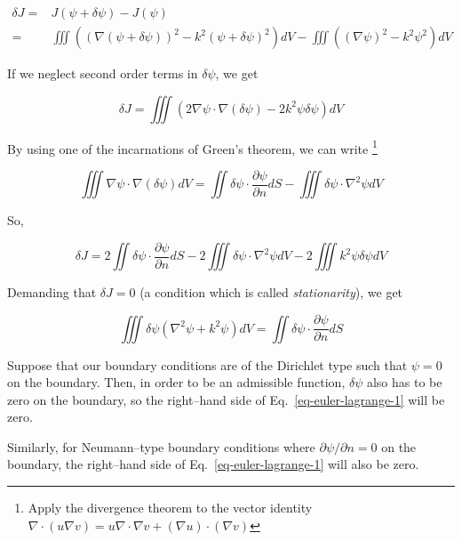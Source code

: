 \begin{align}
\delta J =& J(\psi + \delta \psi) - J(\psi) \\
         =& \iiint \left( (\nabla (\psi + \delta \psi))^2 - k^2 (\psi + \delta \psi)^2 \right) dV - \iiint \left((\nabla \psi)^2 - k^2 \psi^2 \right) dV
\end{align} 

If we neglect second order terms in $\delta \psi$, we get

\begin{equation}
\delta J = \iiint \left( 2 \nabla \psi \cdot \nabla (\delta \psi) - 2 k^2 \psi \delta \psi \right) dV
\end{equation}

By using one of the incarnations of Green's theorem, we can write \footnote{Apply the divergence theorem to the vector identity $\nabla \cdot (u \nabla v) = u \nabla \cdot \nabla v + (\nabla u) \cdot (\nabla v)$}

\begin{equation}
\iiint \nabla \psi \cdot \nabla (\delta \psi) dV = \iint \delta \psi \cdot \frac{\partial \psi}{\partial n} dS - \iiint \delta \psi \cdot \nabla^2 \psi dV
\end{equation} 

So,

\begin{equation}
\delta J = 2\iint \delta \psi \cdot \frac{\partial \psi}{\partial n} dS - 2\iiint \delta \psi \cdot \nabla^2 \psi dV - 2 \iiint k^2 \psi \delta \psi dV
\end{equation} 

Demanding that $\delta J = 0$ (a condition which is called \emph{stationarity}), we get

\begin{equation}
\iiint \delta \psi (\nabla^2 \psi + k^2 \psi ) dV = \iint \delta \psi \cdot \frac{\partial \psi}{\partial n} dS \label{eq-euler-lagrange-1}
\end{equation}

Suppose that our boundary conditions are of the Dirichlet type such that $\psi=0$ on the boundary. Then, in order to be an admissible function, $\delta \psi$ also has to be zero on the boundary, so the right--hand side of Eq.~\ref{eq-euler-lagrange-1} will be zero.

Similarly, for Neumann--type boundary conditions where $\partial \psi / \partial n = 0$ on the boundary, the right--hand side of Eq.~\ref{eq-euler-lagrange-1} will also be zero.

